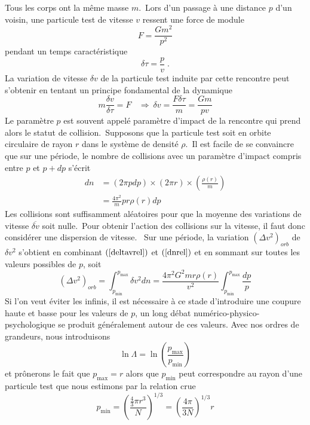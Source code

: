 Tous les corps ont la m\^{e}me masse $m$.\ Lors d'un passage \`{a} une
distance $p$ d'un voisin, une particule test de vitesse $v$ ressent une force
de module
\[
F=\frac{Gm^{2}}{p^{2}}%
\]
pendant un temps caract\'{e}ristique
\[
\delta\tau=\frac{p}{v}\;.
\]
La variation de vitesse $\delta v$ de la particule test induite par cette
rencontre peut s'obtenir en tentant un principe fondamental de la dynamique%
\begin{equation}
m\frac{\delta v}{\delta\tau}=F\ \ \ \ \Rightarrow\ \delta v=\frac{F\delta\tau
}{m}=\frac{Gm}{pv} \label{deltavrel}%
\end{equation}
Le param\`{e}tre $p$ est souvent appel\'{e} param\`{e}tre d'impact de la
rencontre qui prend alors le statut de collision.\ Supposons que la particule
test soit en orbite circulaire de rayon $r$ dans le syst\`{e}me de densit\'{e}
$\rho$.\ Il est facile de se convaincre que sur une p\'{e}riode, le nombre de
collisions avec un param\`{e}tre d'impact compris entre $p$ et $p+dp$
s'\'{e}crit%
\begin{align}
dn  &  =\left(  2\pi pdp\right)  \times\left(  2\pi r\right)  \times\left(
\frac{\rho\left(  r\right)  }{m}\right) \label{dnrel}\\
&  =\frac{4\pi^{2}}{m}pr\rho\left(  r\right)  dp
\end{align}
Les collisions sont suffisamment al\'{e}atoires pour que la moyenne des
variations de vitesse $\overline{\delta v}$ soit nulle.\ Pour obtenir l'action
des collisions sur la vitesse, il faut donc consid\'{e}rer une dispersion de
vitesse. \ Sur une p\'{e}riode, la variation $\left(  \Delta v^{2}\right)
_{orb}$ de $\delta v^{2}$ s'obtient en combinant $\left(  \ref{deltavrel}%
\right)  $ et $\left(  \ref{dnrel}\right)  $ et en sommant sur toutes les
valeurs possibles de $p$, soit%
\[
\left(  \Delta v^{2}\right)  _{orb}=\int_{p_{\min}}^{p_{\max}}\delta
v^{2}dn=\frac{4\pi^{2}G^{2}mr\rho\left(  r\right)  }{v^{2}}\int_{p_{\min}%
}^{p_{\max}}\frac{dp}{p}%
\]
Si l'on veut \'{e}viter les infinis, il est n\'{e}cessaire \`{a} ce stade
d'introduire une coupure haute et basse pour les valeurs de $p$, un long
d\'{e}bat num\'{e}rico-physico-psychologique se produit g\'{e}n\'{e}ralement
autour de ces valeurs. Avec nos ordres de grandeurs, nous introduisons%
\[
\ln\Lambda=\ln\left(  \frac{p_{\max}}{p_{\min}}\right)
\]
et pr\^{o}nerons le fait que $p_{\max}=r$ alors que $p_{\min}$ peut
correspondre au rayon d'une particule test que nous estimons par la relation
crue%
\[
p_{\min}=\left(  \frac{\frac{4}{3}\pi r^{3}}{N}\right)  ^{1/3}=\left(
\frac{4\pi}{3N}\right)  ^{1/3}r
\]
